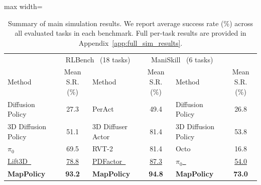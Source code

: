 \begin{table}[t]
\centering
\caption{Summary of main simulation results. We report average success rate (\%) across all evaluated tasks in each benchmark. Full per-task results are provided in Appendix~\ref{app:full_sim_results}.}
\label{tab:main_results_summary}
\small
\setlength{\tabcolsep}{6pt}
\begin{adjustbox}{max width=\textwidth}
\begin{tabular}{lc|lc|lc}
\toprule
\rowcolor{tablehead}
\multicolumn{2}{c|}{MetaWorld~\cite{Yu2020Meta,mclean2025metaworld} (25 tasks)} &
\multicolumn{2}{c|}{RLBench~\cite{James2020RLBench} (18 tasks)} &
\multicolumn{2}{c}{ManiSkill~\cite{Gu2023ManiSkill2} (6 tasks)} \\
\rowcolor{tablehead}
Method & Mean S.R. (\%) & Method & Mean S.R. (\%) & Method & Mean S.R. (\%) \\
\midrule
Diffusion Policy~\cite{chi2024diffusionpolicy} & 27.3 &
PerAct~\cite{shridhar2022peract} & 49.4 &
Diffusion Policy~\cite{chi2024diffusionpolicy} & 26.8 \\
3D Diffusion Policy~\cite{Ze2024DP3} & 51.1 &
3D Diffuser Actor~\cite{3d_diffuser_actor} & 81.4 &
3D Diffusion Policy~\cite{Ze2024DP3} & 53.8 \\
$\pi_0$~\cite{black2026pi0visionlanguageactionflowmodel} & 69.5 &
RVT-2~\cite{goyal2024rvt2} & 81.4 &
Octo~\cite{octo_2023} & 16.8 \\
\underline{Lift3D~\cite{Jia_2025_CVPR}} & \underline{78.8} &
\underline{PDFactor~\cite{Tian_2025_CVPR}} & \underline{87.3} &
\underline{$\pi_0$~\cite{black2026pi0visionlanguageactionflowmodel}} & \underline{54.0} \\
\rowcolor{tablehead}
\textbf{MapPolicy} & \textbf{93.2} &
\textbf{MapPolicy} & \textbf{94.8} &
\textbf{MapPolicy} & \textbf{73.0} \\
\bottomrule
\end{tabular}
\end{adjustbox}
\end{table}
